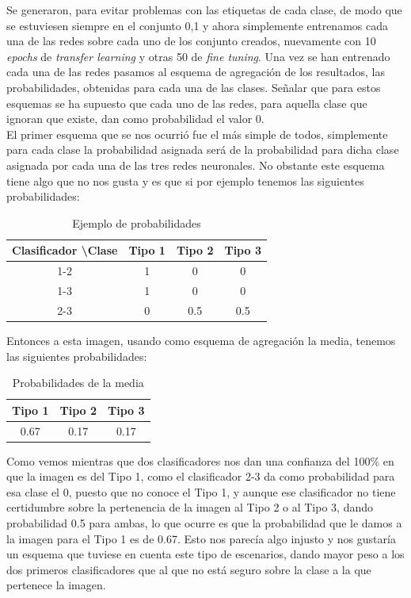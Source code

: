 Se generaron, para evitar problemas con las etiquetas de cada clase, de modo que se estuviesen siempre en el conjunto {0,1} y ahora simplemente entrenamos cada una de las redes sobre cada uno de los conjunto creados, nuevamente con 10 \textit{epochs} de \textit{transfer learning} y otras 50 de \textit{fine tuning}. Una vez se han entrenado cada una de las redes pasamos al esquema de agregación de los resultados, las probabilidades, obtenidas para cada una de las clases. Señalar que para estos esquemas se ha supuesto que cada uno de las redes, para aquella clase que ignoran que existe, dan como probabilidad el valor 0.\\

El primer esquema que se nos ocurrió fue el más simple de todos, simplemente para cada clase la probabilidad asignada será  de la probabilidad para dicha clase asignada por cada una de las tres redes neuronales. No obstante este esquema tiene algo que no nos gusta y es que si por ejemplo tenemos las siguientes probabilidades:

\begin{table}[H]
\centering
\caption{Ejemplo de probabilidades}
\label{my-label}
\begin{tabular}{|c|c|c|c|}
\hline
Clasificador \textbackslash Clase & Tipo 1 & Tipo 2 & Tipo 3 \\ \hline
1-2                               & 1      & 0      & 0      \\ \hline
1-3                               & 1      & 0      & 0      \\ \hline
2-3                               & 0      & 0.5    & 0.5    \\ \hline
\end{tabular}
\end{table}

Entonces a esta imagen, usando como esquema de agregación la media, tenemos las siguientes probabilidades:

\begin{table}[H]
\centering
\caption{Probabilidades de la media}
\begin{tabular}{|c|c|c|}
\hline
Tipo 1 & Tipo 2 & Tipo 3 \\ \hline
0.67   & 0.17   & 0.17   \\ \hline
\end{tabular}
\end{table}

Como vemos mientras que dos clasificadores nos dan una confianza del 100\% en que la imagen es del Tipo 1, como el clasificador 2-3 da como probabilidad para esa clase el 0, puesto que no conoce el Tipo 1, y aunque ese clasificador no tiene certidumbre sobre la pertenencia de la imagen al Tipo 2 o al Tipo 3, dando probabilidad 0.5 para ambas, lo que ocurre es que la probabilidad que le damos a la imagen para el Tipo 1 es de 0.67. Esto nos parecía algo injusto y nos gustaría un esquema que tuviese en cuenta este tipo de escenarios, dando mayor peso a los dos primeros clasificadores que al que no está seguro sobre la clase a la que pertenece la imagen.\\


